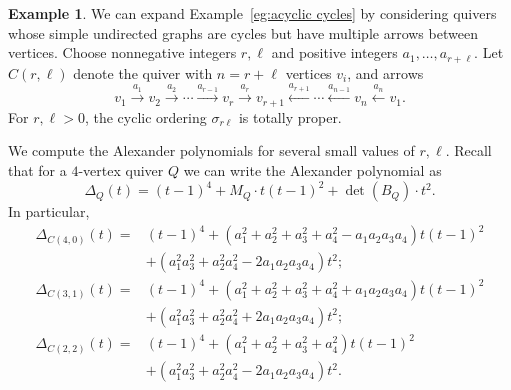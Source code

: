 \documentclass[11pt, letterpaper]{amsart}
\theoremstyle{definition}
\newtheorem{example}[theorem]{Example}
\numberwithin{equation}{section}
\begin{document}
\begin{example}
\label{eg:cycles with multiplicities}
We can expand Example~\ref{eg:acyclic cycles} by considering quivers whose simple undirected graphs are cycles but have multiple arrows between vertices.
Choose nonnegative integers $r, \ell$ and positive integers $a_1, \ldots, a_{r+\ell}$.
Let $C(r, \ell)$ denote the quiver with $n = r + \ell$ vertices $v_i$, and arrows
$$v_1 \stackrel{a_1}\rightarrow v_2 \stackrel{a_2}\rightarrow \cdots \stackrel{a_{r-1}}\rightarrow v_r \stackrel{a_r}\rightarrow v_{r+1} \stackrel{a_{r+1}}\leftarrow \cdots \stackrel{a_{n-1}}\leftarrow v_{n} \stackrel{a_n}\leftarrow v_1.$$
For $r,\ell > 0$, the cyclic ordering $\sigma_{r \ell}$ is totally proper.

We compute the Alexander polynomials for several small values of $r, \ell$. 
Recall that for a $4$-vertex quiver $Q$ we can write the Alexander polynomial as 
$$\Delta_Q(t) = (t-1)^4 + M_Q \cdot t(t-1)^2 + \det(B_Q) \cdot t^2.$$
In particular,
\begin{align*}
\Delta_{C(4,0)}(t) =& (t-1)^4 + (a_1^2 + a_2^2 + a_3^2 + a_4^2-a_1a_2a_3a_4) t(t-1)^2 \\ 
& + ( a_1^2a_3^2 + a_2^2a_4^2 - 2 a_1 a_2 a_3 a_4) t^2; \\
\Delta_{C(3,1)}(t) =& (t-1)^4 + ( a_1^2 + a_2^2 + a_3^2 + a_4^2 + a_1a_2a_3a_4 ) t (t-1)^2 \\ 
& + ( a_1^2a_3^2 + a_2^2a_4^2 + 2 a_1 a_2 a_3 a_4 ) t^2; \\
\Delta_{C(2,2)}(t) =& (t-1)^4 + ( a_1^2 + a_2^2 + a_3^2 + a_4^2 ) t(t-1)^2 \\ 
& + ( a_1^2a_3^2 + a_2^2a_4^2 - 2a_1a_2a_3a_4 ) t^2.
\end{align*}


\end{example}
\end{document}
